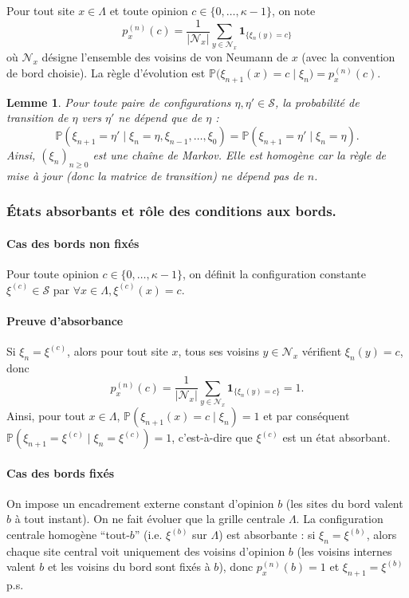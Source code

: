 \documentclass[11pt,a4paper]{article}
\newtheorem*{lemma}{Lemme}
\begin{document}
Pour tout site $x\in\Lambda$ et toute opinion $c\in\{0,\dots,\kappa-1\}$, on note
\[
p_x^{(n)}(c)=\frac{1}{|\mathcal{N}_x|}\sum_{y\in\mathcal{N}_x}\mathbf{1}_{\{\xi_n(y)=c\}}
\]
où $\mathcal{N}_x$ désigne l’ensemble des voisins de von Neumann de $x$ (avec la convention
de bord choisie). La règle d’évolution est $\mathbb{P}\big(\xi_{n+1}(x)=c \mid \xi_n\big)=p_x^{(n)}(c)$.

\begin{lemma}
  Pour toute paire de configurations $\eta,\eta'\in\mathcal{S}$, la probabilité
  de transition de $\eta$ vers $\eta'$ ne dépend que de $\eta$ :
  \[
  \mathbb{P}(\xi_{n+1}=\eta' \mid \xi_n=\eta,\xi_{n-1},\dots,\xi_0)
  =\mathbb{P}(\xi_{n+1}=\eta' \mid \xi_n=\eta).
  \]
  Ainsi, $(\xi_n)_{n\ge 0}$ est une chaîne de Markov.
  Elle est \emph{homogène} car la règle de mise à jour (donc la matrice de transition)
  ne dépend pas de $n$.
\end{lemma}

\subsubsection{États absorbants et rôle des conditions aux bords.\\}

\paragraph{Cas des bords non fixés}
Pour toute opinion $c\in\{0,\dots,\kappa-1\}$, on définit la configuration constante
$\xi^{(c)}\in\mathcal{S}$ par $\forall x\in\Lambda, \xi^{(c)}(x)=c$.

\paragraph{Preuve d'absorbance}

Si $\xi_n=\xi^{(c)}$, alors pour tout site $x$, tous ses voisins $y\in\mathcal{N}_x$
vérifient $\xi_n(y)=c$, donc
\[
p_x^{(n)}(c)=\frac{1}{|\mathcal{N}_x|}\sum_{y\in\mathcal{N}_x}\mathbf{1}_{\{\xi_n(y)=c\}}=1.
\]
Ainsi, pour tout $x\in\Lambda$, $\mathbb{P}(\xi_{n+1}(x)=c\mid
\xi_n)=1$ et par conséquent $\mathbb{P}(\xi_{n+1}=\xi^{(c)}\mid \xi_n=\xi^{(c)})=1$,
c’est-à-dire que $\xi^{(c)}$ est un état absorbant.

\paragraph{Cas des bords fixés}
On impose un encadrement externe constant d’opinion $b$ (les sites du bord valent $b$ à tout instant).
On ne fait évoluer que la grille centrale $\Lambda$.
La configuration centrale homogène ``tout-$b$'' (i.e. $\xi^{(b)}$ sur $\Lambda$) est absorbante :
si $\xi_n=\xi^{(b)}$, alors chaque site central voit uniquement des voisins d’opinion $b$
(les voisins internes valent $b$ et les voisins du bord sont fixés à $b$),
donc $p_x^{(n)}(b)=1$ et $\xi_{n+1}=\xi^{(b)}$ p.s.
\end{document}
